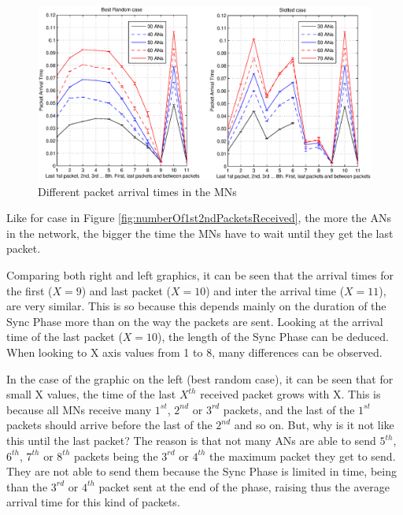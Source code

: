 \begin{figure}[ht]
 \begin{center}
  \includegraphics[width=1\textwidth]{Lastarrivalpackettimes.eps}
 \end{center}
 \caption{Different packet arrival times in the \acp{MN}}
 \label{fig:Lastarrivalpackettimes}
\end{figure}

Like for case in Figure \ref{fig:numberOf1st2ndPacketsReceived}, the more the \acp{AN} in the network, the bigger the time the \acp{MN} have to wait 
until they get the last packet.

Comparing both right and left graphics, it can be seen that the arrival times for the first ($X=9$) and last packet ($X=10$) and inter the arrival 
time ($X=11$), are very similar. This is so because this depends mainly on the duration of the Sync Phase more than on the way the packets are sent. 
Looking at the arrival time of the last packet ($X=10$), the length of the Sync Phase can be deduced. When looking to X axis values from 1 to 8, many
differences can be observed.

In the case of the graphic on the left (best random case), it can be seen that for small X values, the time of the last $X^{th}$ received packet 
grows with X. This is because all \acp{MN} receive many $1^{st}$, $2^{nd}$ or $3^{rd}$ packets, and the last of the $1^{st}$ packets should arrive 
before the last of the $2^{nd}$ and so on. But, why is it not like this until the last packet? The reason is that not many \acp{AN} are able to send
$5^{th}$, $6^{th}$, $7^{th}$ or $8^{th}$ packets being the $3^{rd}$ or $4^{th}$ the maximum packet they get to send. They are not able to send them
because the Sync Phase is limited in time, being than the $3^{rd}$ or $4^{th}$ packet sent at the end of the phase, raising thus the average arrival time
for this kind of packets.

